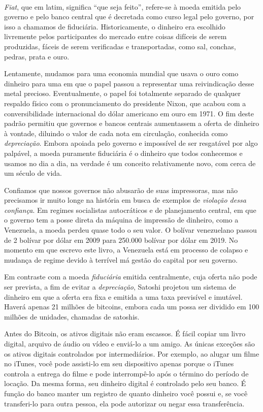 \paragraph{}
\textit{Fiat}, que em latim, significa “que seja feito”, refere-se à moeda emitida pelo governo e pelo banco central que é decretada como curso legal pelo governo, por isso a chamamos de fiduciária. Historicamente, o dinheiro era escolhido livremente pelos participantes do mercado entre coisas difíceis de serem produzidas, fáceis de serem verificadas e transportadas, como sal, conchas, pedras, prata e ouro.

Lentamente, mudamos para uma economia mundial que usava o ouro como dinheiro para uma em que o papel passou a representar uma reivindicação desse metal precioso. Eventualmente, o papel foi totalmente separado de qualquer respaldo físico com o pronunciamento do presidente Nixon, que acabou com a conversibilidade internacional do dólar americano em ouro em 1971. O fim deste padrão permitiu que governos e bancos centrais aumentassem a oferta de dinheiro à vontade, diluindo o valor de cada nota em circulação, conhecida como \textit{depreciação}. Embora apoiada pelo governo e impossível de ser resgatável por algo palpável, a moeda puramente fiduciária é o dinheiro que todos conhecemos e usamos no dia a dia, na verdade é um conceito relativamente novo, com cerca de um século de vida.

Confiamos que nossos governos não abusarão de suas impressoras, mas não precisamos ir muito longe na história em busca de exemplos de \textit{violação dessa confiança}. Em regimes socialistas autocráticos e de planejamento central, em que o governo tem a posse direta da máquina de impressão de dinheiro, como a Venezuela, a moeda perdeu quase todo o seu valor. O bolívar venezuelano passou de 2 bolívar por dólar em 2009 para 250.000 bolívar por dólar em 2019. No momento em que escrevo este livro, a Venezuela está em processo de colapso e mudança de regime devido à terrível má gestão do capital por seu governo.

Em contraste com a moeda \textit{fiduciária} emitida centralmente, cuja oferta não pode ser prevista, a fim de evitar a \textit{depreciação}, Satoshi projetou um sistema de dinheiro em que a oferta era fixa e emitida a uma taxa previsível e imutável. Haverá apenas 21 milhões de bitcoins, embora cada um possa ser dividido em 100 milhões de unidades, chamadas de satoshis.

Antes do Bitcoin, os ativos digitais não eram escassos. É fácil copiar um livro digital, arquivo de áudio ou vídeo e enviá-lo a um amigo. As únicas exceções são os ativos digitais controlados por intermediários. Por exemplo, ao alugar um filme no iTunes, você pode assisti-lo em seu dispositivo apenas porque o iTunes controla a entrega do filme e pode interrompê-lo após o término do período de locação. Da mesma forma, seu dinheiro digital é controlado pelo seu banco. É função do banco manter um registro de quanto dinheiro você possui e, se você transferi-lo para outra pessoa, ela pode autorizar ou negar essa transferência.

